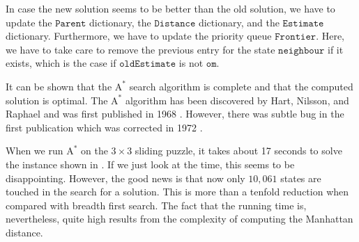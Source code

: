 \begin{enumerate}
\begin{enumerate}
            In case the new solution seems to be better than the old solution, we have to update
            the $\mathtt{Parent}$ dictionary, the $\mathtt{Distance}$ dictionary, and the $\mathtt{Estimate}$
            dictionary.  Furthermore, we have to update the priority queue $\mathtt{Frontier}$.
            Here, we have to take care to remove the previous entry for the state
            $\mathtt{neighbour}$ if it exists, which is the case if $\mathtt{oldEstimate}$ is not $\mathtt{om}$.
      \end{enumerate}
\end{enumerate}
It can be shown that the $\mathrm{A}^*$ search algorithm is complete and that the computed solution is optimal.
The $\mathrm{A}^*$ algorithm has been discovered by Hart, Nilsson, and Raphael and was first published in
1968 \cite{hart:1968}.  However, there was subtle bug in the first publication which was corrected
in 1972 \cite{hart:1972}.

When we run $\mathrm{A}^*$ on the $3 \times 3$ sliding puzzle, it takes about 17 seconds to solve the instance
shown in .  If we just look at the time, this seems to be disappointing.  However, the good
news is that now only $10,061$ states are touched in the search for a solution.  This is more than a tenfold
reduction when compared with breadth first search.  The fact that the running time
is, nevertheless, quite high results from the complexity of computing the Manhattan distance.



